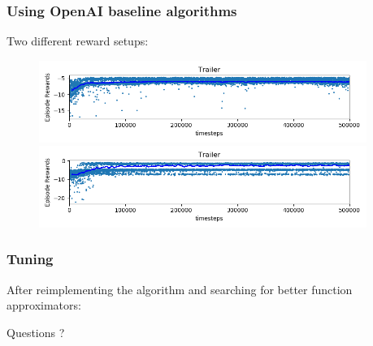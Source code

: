 \documentclass{beamer}
\begin{document}
\begin{frame}
\frametitle{Using OpenAI baseline algorithms}
\begin{center}
Two different reward setups:
\end{center}
\begin{figure}
\includegraphics[width=0.95\textwidth]{zero_rew.png}\\
\includegraphics[width=0.95\textwidth]{pos_rew.png}
\end{figure}
\end{frame}

\begin{frame}
\frametitle{Tuning}
After reimplementing the algorithm and searching for better function approximators:\\
\begin{center}
\end{center}
\end{frame}



\begin{frame}
\Huge{\centerline{Questions ?}}
\end{frame}

\end{document}

